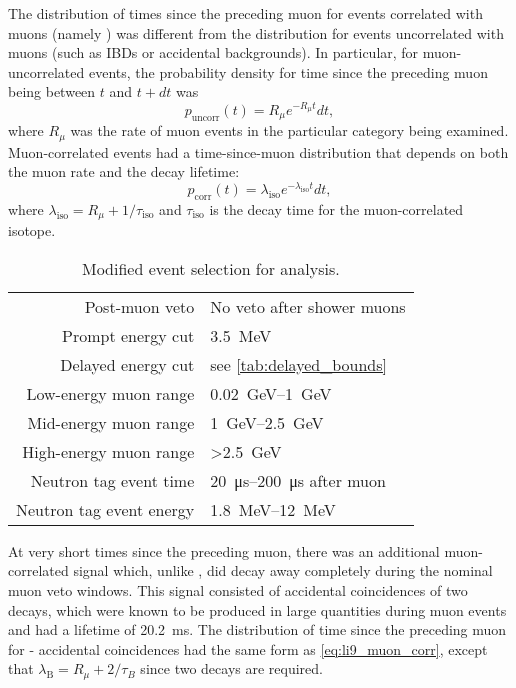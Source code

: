 The distribution of times since the preceding muon
for events correlated with muons (namely \li{})
was different from the distribution for events uncorrelated with muons
(such as IBDs or accidental backgrounds).
In particular, for muon-uncorrelated events,
the probability density for time since the preceding muon
being between $t$ and $t + dt$ was \cite{chris_li9}
\begin{equation}\label{eq:li9_muon_uncorr}
    p_\text{uncorr}(t) = R_\mu e^{-R_\mu t}dt,
\end{equation}
where $R_\mu$ was the rate of muon events in the particular category being examined.
Muon-correlated events had a time-since-muon distribution
that depends on both the muon rate and the decay lifetime:
\begin{equation}\label{eq:li9_muon_corr}
    p_\text{corr}(t) = \lambda_\text{iso} e^{-\lambda_\text{iso} t}dt,
\end{equation}
where $\lambda_\text{iso} = R_\mu + 1/\tau_\text{iso}$
and $\tau_\text{iso}$ is the decay time
for the muon-correlated isotope.

\begin{table}[ht]
    \centering
    \caption[\li{}/\he{} event selection]{Modified event selection for \li{} analysis.}
    \label{tab:li9}
    \begin{tabular}[t]{rl}
        \toprule
        Post-muon veto & No veto after shower muons \\
        Prompt energy cut & \SI{3.5}{\MeV} \\
        Delayed energy cut & see \cref{tab:delayed_bounds} \\
        Low-energy muon range & \SIrange{0.02}{1}{\GeV} \\
        Mid-energy muon range & \SIrange{1}{2.5}{\GeV} \\
        High-energy muon range & \SI{>2.5}{\GeV} \\
        Neutron tag event time & \SIrange{20}{200}{\us} after muon \\
        Neutron tag event energy & \SIrange{1.8}{12}{\MeV} \\
        \bottomrule
    \end{tabular}
\end{table}

At very short times since the preceding muon,
there was an additional muon-correlated signal
which, unlike \li{}, did decay away completely
during the nominal muon veto windows.
This signal consisted of accidental coincidences
of two \boron{} decays,
which were known to be produced in large quantities
during muon events \cite{kamland_li9}
and had a lifetime of \SI{20.2}{\ms}.
The distribution of time since the preceding muon
for \boron{}-\boron{} accidental coincidences
had the same form as \cref{eq:li9_muon_corr},
except that $\lambda_\text{B} = R_\mu + 2/\tau_{B}$
since two \boron{} decays are required.

